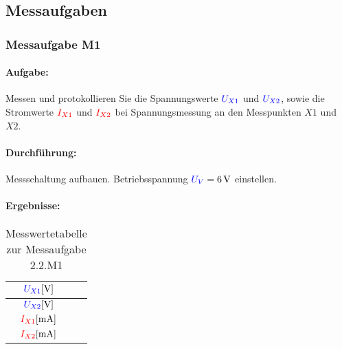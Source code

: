 \documentclass[11pt,a4paper,titlepage,parskip=half]{scrreprt}
\begin{document}
        \subsection{Messaufgaben}
            \subsubsection{Messaufgabe M1}
            \paragraph{Aufgabe:} Messen und protokollieren Sie die Spannungswerte $\textcolor{blue}{U_{X1}}$ und $\textcolor{blue}{U_{X2}}$, sowie die Stromwerte $\textcolor{red}{I_{X1}}$ und $\textcolor{red}{I_{X2}}$ bei Spannungsmessung an den Messpunkten $X1$ und $X2$. 
        
            \paragraph{Durchführung:} Messschaltung aufbauen. Betriebsspannung $\textcolor{blue}{U_V} = \SI{6}{\volt}$ einstellen.
            \paragraph{Ergebnisse:}
                 \begin{center}
                    \begin{table}[H]
                        \caption{Messwertetabelle zur Messaufgabe 2.2.M1}
                        \label{tbl:messergebnisse2.1}
                        \renewcommand{\arraystretch}{1.6}
                        \begin{center}
                            \begin{tabular}{c|c}
                                $\textcolor{blue}{U_{X1}} [\si{\volt}]$ & \qquad\qquad\qquad\\\hline
                                $\textcolor{blue}{U_{X2}} [\si{\volt}]$ & \qquad\qquad\qquad\\ \hline
                                $\textcolor{red}{I_{X1}} [\si{\milli\ampere}]$ & \qquad\qquad\qquad\\\hline
                                $\textcolor{red}{I_{X2}} [\si{\milli\ampere}]$ & \qquad\qquad\qquad
                            \end{tabular}
                        \end{center}
                    \end{table}
                \end{center}
            
\end{document}
